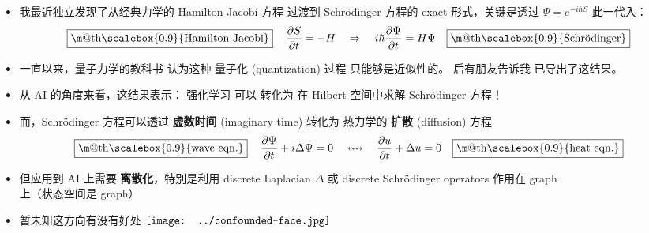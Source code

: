 \documentclass[15pt]{beamer}
\makeatletter
\newcommand{\cc}[2]{#1}
\newcommand{\cc}[2]{#2}
\newcommand{\emp}[1]{{\color{violet}#1}}
\newcommand{\red}[1]{{\color{red}#1}}
\newcommand*\confoundFace{$\vcenter{\hbox{\texttt{[image: ../confounded-face.jpg]}}}$}
\renewcommand{\boxed}[1]{\fbox{\m@th$\displaystyle\scalebox{0.9}{#1}$} \,}
\makeatother
\begin{document}
\begin{frame}[plain]
\begin{itemize}
	\item \cc{
	我最近独立发现了从经典力学的 Hamilton-Jacobi 方程 过渡到 Schr\"{o}dinger 方程的 exact 形式，关键是透过 $\Psi = e^{-i \hbar S}$ 此一代入：}{
	Recently I independently discovered an exact way to go from the classical Hamilton-Jacobi equation to the Schr\"{o}dinger equation via the substitution $\Psi = e^{-i \hbar S}$:
	}
		\begin{equation}
		\boxed{\mbox{Hamilton-Jacobi}} \quad \frac{\partial S}{\partial t} = - H \quad
		\Rightarrow
		\quad i \hbar \frac{\partial \Psi}{\partial t} = H \Psi \quad \boxed{\mbox{Schr\"{o}dinger}}
		\end{equation} 
		
	\item \cc{
	一直以来，量子力学的教科书 认为这种 量子化 (quantization) 过程 只能够是近似性的。  后有朋友告诉我 \parencite{Field2010} 已导出了这结果。}{
	We have always been told in textbooks that such a process of \emp{quantization} can only be achieved heuristically, but some friend informed me that \parencite{Field2010} has derived this result.
	}
	
	\item \cc{
	从 AI 的角度来看，这结果表示： \red{强化学习 可以 转化为 在 Hilbert 空间中求解 Schr\"{o}dinger 方程！}}{
	From the perpective of AI, this means that \red{solving the reinforcement learning problem is equivalent to solving the Schr\"{o}dinger equation in Hilbert space!}
	}
	
	\item \cc{
	而，Schr\"{o}dinger 方程可以透过 \textbf{虚数时间} (imaginary time) 转化为 热力学的 \textbf{扩散} (diffusion) 方程}{
	Moreover, the Schr\"{o}dinger equation can be transformed into the \emp{diffusion} / heat equation via the introduction of \emp{imaginary time}:
	}
		\begin{equation}
			\boxed{\mbox{wave eqn.}} \quad \frac{\partial \Psi}{\partial t} + i \Delta \Psi = 0
			\quad \leftrightsquigarrow \quad
			\frac{\partial u}{\partial t} + \Delta u = 0 \quad \boxed{\mbox{heat eqn.}}
		\end{equation}

	\item \cc{
	但应用到 AI 上需要 \textbf{离散化}，特别是利用 discrete Laplacian $\Delta$ 或 discrete Schr\"{o}dinger operators 作用在 \red{graph} 上（状态空间是 graph）}{
	Yet, if this is to be applicable to AGI, we need to \emp{discretize} the state space (which becomes a graph), and use the discrete Laplacian $\Delta$ or discrete Schr\"{o}dinger operator to act on graphs
	}
	
	\item \cc{
	暂未知这方向有没有好处 \confoundFace}{
	Impressive as it may sound, this may be of low practical value \confoundFace
	}
	
\end{itemize}
\end{frame}
\end{document}

